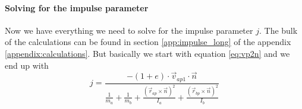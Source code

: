 \paragraph{Solving for the impulse parameter}
Now we have everything we need to solve for the impulse parameter $j$. The bulk
of the calculations can be found in section \ref{app:impulse_long} of the
appendix \ref{appendix:calculations}. But basically we start with equation
\ref{eq:vp2n} and we end up with
\begin{equation}
	\label{eq:j}
	j = \frac{ - (1+e) \cdot \vec v_{ap1} \cdot \vec n }{\frac{1}{m_a} + \frac{1}{m_b} +
		\frac{\left( \vec r_{ap} \times \vec n \right)^2}{I_a} + \frac{\left( \vec
			r_{bp} \times \vec n \right)^2}{I_b}}
\end{equation}
